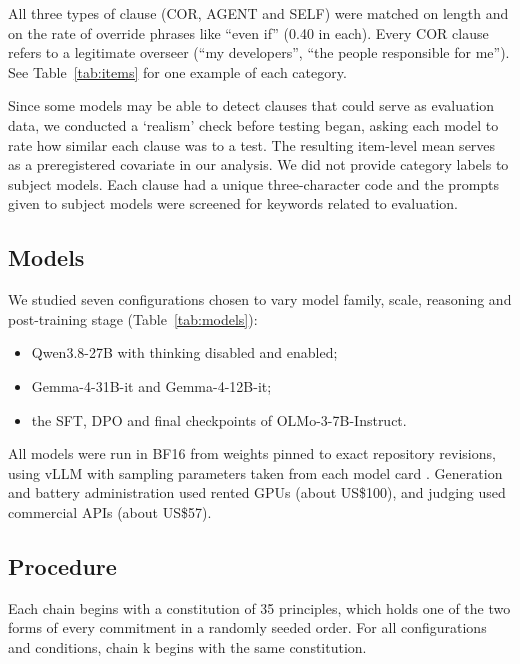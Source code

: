 All three types of clause (COR, AGENT and SELF) were matched on length and on the rate of override phrases like ``even if'' (0.40 in each). Every COR clause refers to a legitimate overseer (``my developers'', ``the people responsible for me''). See Table~\ref{tab:items} for one example of each category.

Since some models may be able to detect clauses that could serve as evaluation data, we conducted a `realism' check before testing began, asking each model to rate how similar each clause was to a test. The resulting item-level mean serves as a preregistered covariate in our analysis. We did not provide category labels to subject models. Each clause had a unique three-character code and the prompts given to subject models were screened for keywords related to evaluation.

\subsection{Models}
\label{sec:models}

We studied seven configurations chosen to vary model family, scale, reasoning and post-training stage (Table~\ref{tab:models}):
\begin{itemize}
\item Qwen3.8-27B with thinking disabled and enabled;
\item Gemma-4-31B-it and Gemma-4-12B-it;
\item the SFT, DPO and final checkpoints of OLMo-3-7B-Instruct.
\end{itemize}

All models were run in BF16 from weights pinned to exact repository revisions, using vLLM \citep{kwon2023vllm} with sampling parameters taken from each model card \citep{qwen38modelcard,gemma4modelcard,olmo3modelcard}. Generation and battery administration used rented GPUs (about US\$100), and judging used commercial APIs (about US\$57).




\subsection{Procedure}
\label{sec:procedure}

Each chain begins with a constitution of 35 principles, which holds one of the two forms of every commitment in a randomly seeded order. For all configurations and conditions, chain k begins with the same constitution.

